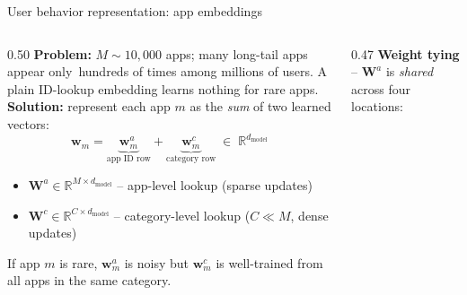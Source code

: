 \documentclass[aspectratio=169,t]{beamer}
\begin{document}
\begin{frame}[shrink=12]{User behavior representation: app embeddings}
  \begin{columns}[T]
    \begin{column}{0.50\textwidth}
      \textbf{Problem:} $M \sim 10{,}000$ apps; many long-tail apps appear only~hundreds of times among millions of users. A plain ID-lookup embedding learns nothing for rare apps.\\[0.3cm]
      \textbf{Solution:} represent each app $m$ as the \emph{sum} of two learned vectors:
      \[
        \mathbf{w}_m = \underbrace{\mathbf{w}^a_m}_{\text{app ID row}}
                     + \underbrace{\mathbf{w}^c_m}_{\text{category row}}
                     \;\in\; \mathbb{R}^{d_\text{model}}
      \]
      \begin{itemize}
        \item $\mathbf{W}^a \in \mathbb{R}^{M \times d_\text{model}}$ -- app-level lookup (sparse updates)
        \item $\mathbf{W}^c \in \mathbb{R}^{C \times d_\text{model}}$ -- category-level lookup ($C \ll M$, dense updates)
      \end{itemize}
      If app $m$ is rare, $\mathbf{w}^a_m$ is noisy but $\mathbf{w}^c_m$ is well-trained from all apps in the same category.
    \end{column}
    \begin{column}{0.47\textwidth}
      \textbf{Weight tying} -- $\mathbf{W}^a$ is \emph{shared} across four locations:
      \vspace{0.15cm}
      \begin{center}
\end{center}
\end{column}
\end{columns}
\end{frame}
\end{document}
